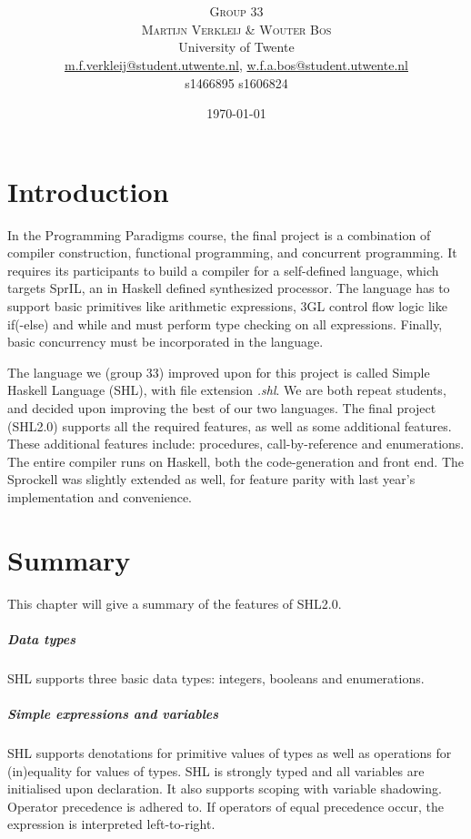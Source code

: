 \documentclass[twoside]{report}
\title{\vspace{-15mm}\fontsize{24pt}{10pt}\selectfont\textbf{\articletitle}} %
\author{
\large
\textsc{Group 33}\\[-0.75mm]
\textsc{Martijn Verkleij \& Wouter Bos}\\[2mm] %
\normalsize University of Twente \\ %
\normalsize \href{mailto:m.f.verkleij@student.utwente.nl}{m.f.verkleij@student.utwente.nl},
\href{mailto:w.bos@student.utwente.nl}{w.f.a.bos@student.utwente.nl}\\%
\normalsize s1466895 s1606824
}
\date{\today}
\begin{document}
\thispagestyle{empty}
\maketitle %



\tableofcontents


\chapter{Introduction}
\label{introduction}
In the Programming Paradigms course, the final project is a combination of compiler construction, functional programming, and concurrent programming. It requires its participants to build a compiler for a self-defined language, which targets SprIL, an in Haskell defined synthesized processor. The language has to support basic primitives like arithmetic expressions, 3GL control flow logic like if(-else) and while and must perform type checking on all expressions. Finally, basic concurrency must be incorporated in the language.

The language we (group 33) improved upon for this project is called Simple Haskell Language (SHL), with file extension \emph{.shl}. We are both repeat students, and decided upon improving the best of our two languages. The final project (SHL2.0) supports all the required features, as well as some additional features. These additional features include: procedures, call-by-reference and enumerations. The entire compiler runs on Haskell, both the code-generation and front end. The Sprockell was slightly extended as well, for feature parity with last year's implementation and convenience.


\chapter{Summary}
\label{summary}
This chapter will give a summary of the features of SHL2.0.
\paragraph{Data types} SHL supports three basic data types: integers, booleans and enumerations.
\paragraph{Simple expressions and variables} SHL supports denotations for primitive values of types as well as operations for (in)equality for values of types. SHL is strongly typed and all variables are initialised upon declaration. It also supports scoping with variable shadowing. Operator precedence is adhered to. If operators of equal precedence occur, the expression is interpreted left-to-right.
\end{document}
